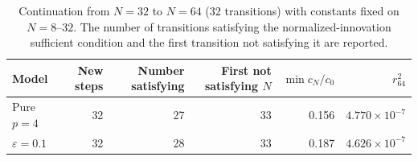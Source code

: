\begin{table}[!htbp]
\centering\small
\caption{Continuation from $N=32$ to $N=64$ (32 transitions) with constants fixed on $N=8$--$32$. The number of transitions satisfying the normalized-innovation sufficient condition and the first transition not satisfying it are reported.}
\label{tab:continuation-window}
\begin{tabular}{@{}lrrrrr@{}}
\toprule
Model & New steps & Number satisfying & First not satisfying $N$ & $\min c_N/c_0$ & $r_{64}^2$ \\
\midrule
Pure $p=4$ & 32 & 27 & 33 & 0.156 & $4.770\times10^{-7}$ \\
$\varepsilon=0.1$ & 32 & 28 & 33 & 0.187 & $4.626\times10^{-7}$ \\
\bottomrule
\end{tabular}
\end{table}
